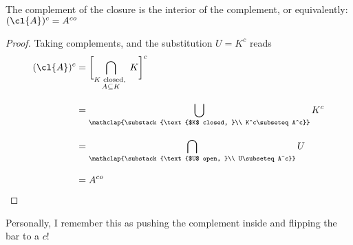 \documentclass[../main-v2-manifolds.tex]{subfiles}
\begin{document}
\begin{wts}\label{chp4:flipping-interior-to-closure}
    The complement of the closure is the interior of the complement, or equivalently: $(\cl{A})^c = A^{co}$
\end{wts}
\begin{proof}
    Taking complements, and the substitution $U = K^c$ reads
    \begin{align*}
        (\cl{A})^c &= \biggl[\bigcap_{{\substack{\text{$K$ closed, }\\ A\subseteq K}}} K \biggr]^c\\[2ex]
        &= \bigcup_{\mathclap{\substack{\text{$K$ closed, }\\ K^c\subseteq A^c}}} K^c\\[2ex]
        &= \bigcap_{\mathclap{\substack{\text{$U$ open, }\\ U\subseteq A^c}}} U\\[2ex]
        &= A^{co}
    \end{align*}
\end{proof}
\begin{remark}
    Personally, I remember this as pushing the complement inside and flipping the bar to a $c$!
\end{remark}
\end{document}
